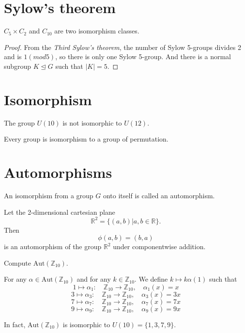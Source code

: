 \section{Sylow's theorem}

\begin{theorem}
    $C_5 \times C_2$ and $C_{10}$ are two isomorphism classes.
\end{theorem}
\begin{proof}
    From the \textit{Third Sylow's theorem}, the number of Sylow 5-groups divides 2 and is $1 (mod 5)$, so there is only one Sylow 5-group.
    And there is a normal subgroup $K \trianglelefteq G$ such that $|K| = 5$.
\end{proof}

\section{Isomorphism}

\begin{example}
    The group $U(10)$ is not isomorphic to $U(12)$.
\end{example}

\begin{theorem}
    Every group is isomorphism to a group of permutation.
\end{theorem}

\section{Automorphisms}

\begin{definition}
    An isomorphism from a group $G$ onto itself is called an automorphism.
\end{definition}

\begin{example}
    Let the 2-dimensional cartesian plane
    \[
        \mathbb{R}^2 = \{ (a,b) | a, b \in \mathbb{R} \}.
    \]
    Then
    \[
        \phi(a,b) = (b,a)
    \]
    is an automorphism of the group $\mathbb{R}^2$ under componentwise addition.
\end{example}

\begin{example}
    Compute $\text{Aut}(\mathbb{Z}_{10})$.
\end{example}
\begin{solution}
    For any $\alpha \in \text{Aut}(\mathbb{Z}_{10})$ and for any $k \in \mathbb{Z}_{10}$. We define $k \mapsto k \alpha(1)$ such that 
    \[
        1 \mapsto \alpha_1 :\quad \mathbb{Z}_{10} \to \mathbb{Z}_{10}, \quad \alpha_1(x) = x
    \]
    \[
        3 \mapsto \alpha_3 :\quad \mathbb{Z}_{10} \to \mathbb{Z}_{10}, \quad \alpha_3(x) = 3x
    \]
    \[
        7 \mapsto \alpha_7 :\quad \mathbb{Z}_{10} \to \mathbb{Z}_{10}, \quad \alpha_7(x) = 7x
    \]
    \[
        9 \mapsto \alpha_9 :\quad \mathbb{Z}_{10} \to \mathbb{Z}_{10}, \quad \alpha_9(x) = 9x
    \]

    In fact, $\text{Aut}(\mathbb{Z}_{10})$ is isomorphic to $U(10) = \{ 1, 3, 7, 9\}$.
\end{solution}

